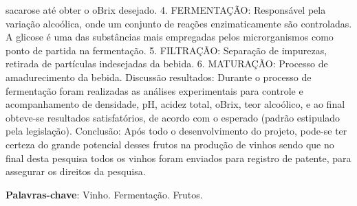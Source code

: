 \documentclass[article,12pt,onesidea,4paper,english,brazil]{abntex2}
\begin{document}
	sacarose até obter o oBrix desejado. 4. FERMENTAÇÃO: Responsável pela variação
	alcoólica, onde um conjunto de reações enzimaticamente são controladas. A glicose
	é uma das substâncias mais empregadas pelos microrganismos como ponto de
	partida na fermentação. 5. FILTRAÇÃO: Separação de impurezas, retirada de
	partículas indesejadas da bebida. 6. MATURAÇÃO: Processo de amadurecimento
	da bebida. Discussão resultados: Durante o processo de fermentação foram
	realizadas as análises experimentais para controle e acompanhamento de
	densidade, pH, acidez total, oBrix, teor alcoólico, e ao final obteve-se resultados
	satisfatórios, de acordo com o esperado (padrão estipulado pela legislação).
	Conclusão: Após todo o desenvolvimento do projeto, pode-se ter certeza do grande
	potencial desses frutos na produção de vinhos sendo que no final desta pesquisa
	todos os vinhos foram enviados para registro de patente, para assegurar os direitos
	da pesquisa.
	
	\vspace{\onelineskip}
	
	\noindent
	\textbf{Palavras-chave}: Vinho. Fermentação. Frutos.
	
\end{document}
